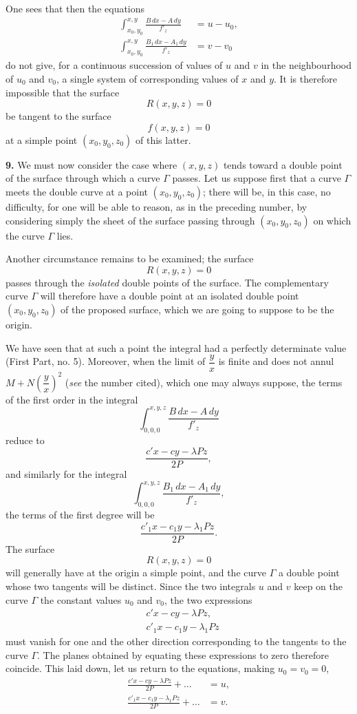 \documentclass{article}
\begin{document}
One sees that then the equations
\[
\begin{aligned}
\int_{x_{0}, y_{0}}^{x, y} \frac{B\,dx - A\,dy}{f'_{z}} &= u - u_{0}, \\
\int_{x_{0}, y_{0}}^{x, y} \frac{B_{1}\,dx - A_{1}\,dy}{f'_{z}} &= v - v_{0}
\end{aligned}
\]
do not give, for a continuous succession of values of $u$ and $v$ in the neighbourhood of $u_{0}$ and $v_{0}$, a single system of corresponding values of $x$ and $y$. It is therefore impossible that the surface
\[
R(x, y, z) = 0
\]
be tangent to the surface
\[
f(x, y, z) = 0
\]
at a simple point $(x_{0}, y_{0}, z_{0})$ of this latter.

\textbf{9.} We must now consider the case where $(x, y, z)$ tends toward a double point of the surface through which a curve $\Gamma$ passes. Let us suppose first that a curve $\Gamma$ meets the double curve at a point $(x_{0}, y_{0}, z_{0})$; there will be, in this case, no difficulty, for one will be able to reason, as in the preceding number, by considering simply the sheet of the surface passing through $(x_{0}, y_{0}, z_{0})$ on which the curve $\Gamma$ lies.

Another circumstance remains to be examined; the surface
\[
R(x, y, z) = 0
\]
passes through the \emph{isolated} double points of the surface. The complementary curve
$\Gamma$ will therefore have a double point at an isolated double point $(x_{0}, y_{0}, z_{0})$ of the proposed surface, which we are going to suppose to be the origin.

We have seen that at such a point the integral had a perfectly determinate value (First Part, no. 5). Moreover, when the limit of $\dfrac{y}{x}$ is finite and does not annul $M + N\left( \dfrac{y}{x} \right)^{2}$ (\emph{see} the number cited), which one may always suppose, the terms of the first order in the integral
\[
\int_{0, 0, 0}^{x, y, z} \frac{B\,dx - A\,dy}{f'_{z}}
\]
reduce to
\[
\frac{c'x - cy - \lambda Pz}{2P},
\]
and similarly for the integral
\[
\int_{0, 0, 0}^{x, y, z} \frac{B_{1}\,dx - A_{1}\,dy}{f'_{z}},
\]
the terms of the first degree will be
\[
\frac{c'_{1}x - c_{1}y - \lambda_{1}Pz}{2P}.
\]
The surface
\[
R(x, y, z) = 0
\]
will generally have at the origin a simple point, and the curve $\Gamma$ a double point whose two tangents will be distinct. Since the two integrals $u$ and $v$ keep on the curve $\Gamma$ the constant values $u_{0}$ and $v_{0}$, the two expressions
\[
\begin{aligned}
&c'x - cy - \lambda Pz, \\
&c'_{1}x - c_{1}y - \lambda_{1}Pz
\end{aligned}
\]
must vanish for one and the other direction corresponding to the tangents to the curve $\Gamma$. The planes obtained by equating these expressions to
zero therefore coincide. This laid down, let us return to the equations, making $u_{0} = v_{0} = 0$,
\[
\begin{aligned}
\frac{c'x - cy - \lambda Pz}{2P} + \ldots &= u, \\
\frac{c'_{1}x - c_{1}y - \lambda_{1}Pz}{2P} + \ldots &= v.
\end{aligned}
\]
\end{document}
